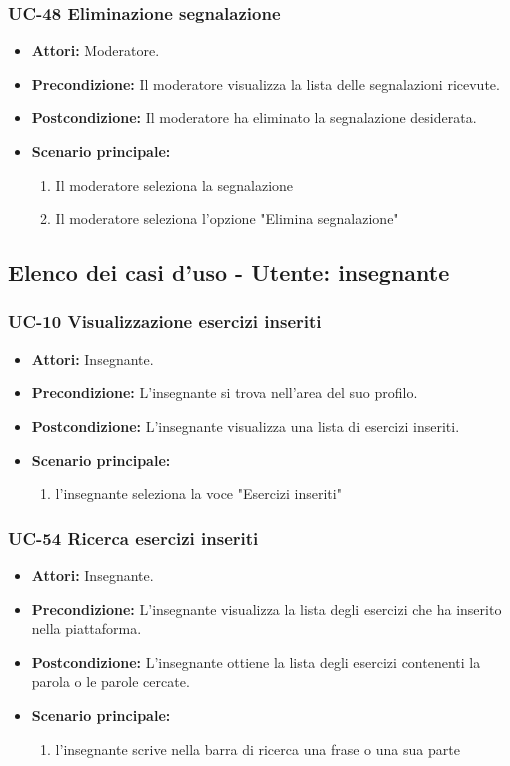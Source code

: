 \subsubsection{UC-48 Eliminazione segnalazione}
\begin{itemize}
	\item \textbf{Attori:} Moderatore.
	\item \textbf{Precondizione:} Il moderatore visualizza la lista delle segnalazioni ricevute.
	\item \textbf{Postcondizione:} Il moderatore ha eliminato la segnalazione desiderata.
	\item \textbf{Scenario principale:}
	\begin{enumerate}
		\item Il moderatore seleziona la segnalazione
		\item Il moderatore seleziona l'opzione "Elimina segnalazione"
	\end{enumerate}
\end{itemize}

\subsection{Elenco dei casi d'uso - Utente: insegnante}		
\subsubsection{UC-10 Visualizzazione esercizi inseriti}
\begin{itemize}
\item \textbf{Attori: }Insegnante.
		\item \textbf{Precondizione: }L'insegnante si trova nell'area del suo profilo.
		\item \textbf{Postcondizione: }L'insegnante visualizza una lista di esercizi inseriti. 
		\item \textbf{Scenario principale:}
		\begin{enumerate}
			\item l'insegnante seleziona la voce "Esercizi inseriti"
		\end{enumerate}
	\end{itemize}

\subsubsection{UC-54 Ricerca esercizi inseriti}
\begin{itemize}
	\item \textbf{Attori:} Insegnante.
	\item \textbf{Precondizione:} L'insegnante visualizza la lista degli esercizi che ha inserito nella piattaforma.
	\item \textbf{Postcondizione:} L'insegnante ottiene la lista degli esercizi contenenti la parola o le parole cercate.
	\item \textbf{Scenario principale:}
		\begin{enumerate}
				\item l'insegnante scrive nella barra di ricerca una frase o una sua parte
		\end{enumerate}
\end{itemize}


